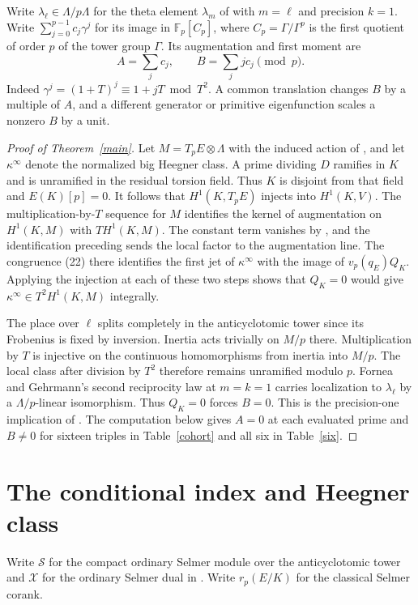 \documentclass[11pt]{article}
\newcommand{\F}{\mathbb F}
\begin{document}
Write $\lambda_\ell\in\Lambda/p\Lambda$ for the theta element $\lambda_m$ of \cite[Definition 3.14]{FG} with $m=\ell$ and precision $k=1$. Write $\sum_{j=0}^{p-1}c_j\gamma^j$ for its image in $\F_p[C_p]$, where $C_p=\Gamma/\Gamma^p$ is the first quotient of order $p$ of the tower group $\Gamma$. Its augmentation and first moment are
\[
 A=\sum_j c_j,\qquad B=\sum_j j c_j\pmod p .
\]
Indeed $\gamma^j=(1+T)^j\equiv1+jT\bmod T^2$. A common translation changes $B$ by a multiple of $A$, and a different generator or primitive eigenfunction scales a nonzero $B$ by a unit.

\begin{proof}[Proof of Theorem~\ref{main}]
Let $M=T_pE\otimes\Lambda$ with the induced action of \cite[\S3.0.1]{FG}, and let $\kappa^\infty$ denote the normalized big Heegner class. A prime dividing $D$ ramifies in $K$ and is unramified in the residual torsion field. Thus $K$ is disjoint from that field and $E(K)[p]=0$. It follows that $H^1(K,T_pE)$ injects into $H^1(K,V)$. The multiplication-by-$T$ sequence for $M$ identifies the kernel of augmentation on $H^1(K,M)$ with $TH^1(K,M)$. The constant term vanishes by \cite[Lemma 3.12]{FG}, and the identification preceding \cite[Lemma 3.12]{FG} sends the local factor to the augmentation line. The congruence (22) there identifies the first jet of $\kappa^\infty$ with the image of $v_p(q_E)Q_K$. Applying the injection at each of these two steps shows that $Q_K=0$ would give $\kappa^\infty\in T^2H^1(K,M)$ integrally.

The place over $\ell$ splits completely in the anticyclotomic tower since its Frobenius is fixed by inversion. Inertia acts trivially on $M/p$ there. Multiplication by $T$ is injective on the continuous homomorphisms from inertia into $M/p$. The local class after division by $T^2$ therefore remains unramified modulo $p$. Fornea and Gehrmann's second reciprocity law \cite[Theorem 3.16]{FG} at $m=k=1$ carries localization to $\lambda_\ell$ by a $\Lambda/p$-linear isomorphism. Thus $Q_K=0$ forces $B=0$. This is the precision-one implication of \cite[\S\S1--2]{criterion}. The computation below gives $A=0$ at each evaluated prime and $B\ne0$ for sixteen triples in Table~\ref{cohort} and all six in Table~\ref{six}.
\end{proof}

\section{The conditional index and Heegner class}
Write $\mathcal S$ for the compact ordinary Selmer module over the anticyclotomic tower and $\mathcal X$ for the ordinary Selmer dual in \cite[\S3.1]{FG}. Write $r_p(E/K)$ for the classical Selmer corank.
\end{document}
